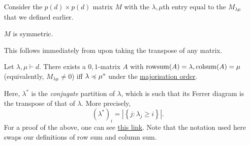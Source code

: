 	Consider the $p(d) \times p(d)$ matrix $M$ with the ${\lambda,\mu}$th entry equal to the $M_{\lambda\mu}$ that we defined earlier.
	
	\begin{fcor}
		$M$ is symmetric.
	\end{fcor}
	This follows immediately from  upon taking the transpose of any matrix.

	\begin{ftheo}
		\label{gale-ryser}
		Let $\lambda,\mu \vdash d$. There exists a $0,1$-matrix $A$ with $\operatorname{rowsum}(A) = \lambda,\operatorname{colsum}(A) = \mu$ (equivalently, $M_{\lambda\mu} \ne 0$) iff $\lambda \preccurlyeq \mu^*$ under the \hyperref[def: majorisation order]{majorisation order}.
	\end{ftheo}

	Here, $\lambda^*$ is the \emph{conjugate} partition of $\lambda$, which is such that its Ferrer diagram is the transpose of that of $\lambda$. More precisely,
	\[ (\lambda^*)_i = \left| \left\{ j : \lambda_j \ge i \right\} \right|. \]
	For a proof of the above, one can see \href{http://www.math.iitb.ac.in/~krishnan/phd-2022/krause_gale_ryser.pdf}{this link}. Note that the notation used here swaps our definitions of row sum and column sum. %



